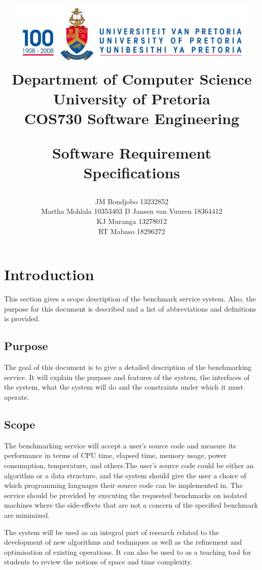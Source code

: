 \documentclass[a4paper,12pt]{article}
\title{\includegraphics[width=12cm]{Eeufeeslogo.jpg} \\
       Department of Computer Science \\
       University of Pretoria \\
       \vspace{0.5cm}
       COS730 Software Engineering \\
       \vspace{0.5cm}
       \begin{large} \textbf{Software Requirement Specifications}\end{large}}
\date{}
\author{	JM Bondjobo		13232852 		\\
		Martha Mohlala		10353403
		D Jansen van Vuuren	18364412
		 \\
		 KJ Muranga         13278012        \\
		 RT Mabaso          18296272
}
\begin{document}
\maketitle
\thispagestyle{empty}
\clearpage

\newpage
{}
\thispagestyle{empty}
\tableofcontents
\clearpage

\newpage
{}

\section {Introduction}
This section gives a scope description of the benchmark service system. Also, the purpose for this document is described and a list of abbreviations and definitions is provided.
\subsection{Purpose}
The goal of this document is to give a detailed description of the  benchmarking service. It will explain the purpose and features of the system, the interfaces of the system, what the system will do and the constraints under which it must operate.


\subsection{Scope}
The benchmarking service will accept a user's source code and measure its performance in terms of CPU time, elapsed time, memory usage, power consumption, temperature, and others.The user's source code could be either an algorithm or a data structure, and the system should give the user a choice of which programming languages their source code can be implemented in. The service should be provided by executing the requested benchmarks on isolated machines where the side-effects that are not a concern of the specified benchmark are minimized.

The system will be used as an integral part of research related to the development of new algorithms and techniques as well as the refinement and optimisation of existing operations. It can also be used to as a teaching tool for students to review the notions of space and time complexity.
\end{document}
